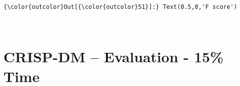 \documentclass[11pt]{article}
\begin{document}
\begin{Verbatim}[commandchars=\\\{\}]
{\color{outcolor}Out[{\color{outcolor}51}]:} Text(0.5,0,'F score')
\end{Verbatim}
            
    \begin{center}
    \end{center}
    { \hspace*{\fill} \\}
    
    \hypertarget{crisp-dm-evaluation---15-time}{%
\section{CRISP-DM -- Evaluation - 15\%
Time}\label{crisp-dm-evaluation---15-time}}
\end{document}
